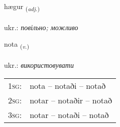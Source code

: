 \documentclass[frontgrid, backgrid]{flacards}\usepackage[]{graphicx}\usepackage[]{xcolor}
\begin{document}
{hægur \small{\textsubscript{(\textit{adj.})}} \\[1ex] %
\textphonetic{[haiːɣʏr]} \\
ukr.: \emph{повільно; можливо} \\  [2ex]
\renewcommand*{\arraystretch}{0.8}
}

\renewcommand{\flhead}{\vskip5pt \fboxsep=0pt {\small\bfseries\footnotesize Sagnorð | дієслово}}
\renewcommand{\fcfoot}{\vskip5pt \fboxsep=0pt \hspace{2pt}{\small\bfseries\footnotesize 1K}}

\renewcommand{\blhead}{\vskip5pt {\small\bfseries\footnotesize Sagnorð | дієслово }}
\renewcommand{\bcfoot}{\vskip5pt \hspace{2pt}{\small\bfseries\footnotesize 1K}}


{nota \small{\textsubscript{(\textit{v.})}} \\[1ex] %
\textphonetic{[nɔːta]} \\
ukr.: \emph{використовувати} \\  [2ex]
\renewcommand*{\arraystretch}{0.8}
\begin{tabular}{p{1cm}l}
\textsc{1sg}: & nota -- notaði -- notað \\ 
\textsc{2sg}: & notar -- notaðir -- notað \\ 
\textsc{3sg}: & notar -- notaði -- notað \\ 
\end{tabular}
}

\renewcommand{\flhead}{\vskip5pt \fboxsep=0pt {\small\bfseries\footnotesize Fornafn | займенник}}
\renewcommand{\fcfoot}{\vskip5pt \fboxsep=0pt \hspace{2pt}{\small\bfseries\footnotesize 1K}}
\end{document}
